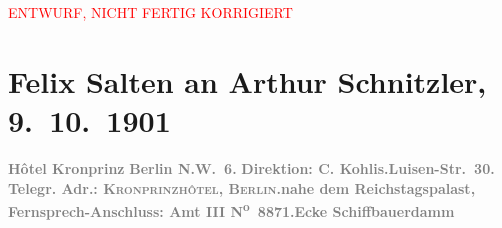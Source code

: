 
\begin{center}
            \textcolor{red}{ENTWURF, NICHT FERTIG KORRIGIERT}
                      \end{center}
            
         
         \renewcommand{\erwaehntePersonen}{Personen: Carl Kohlis, Olga Schnitzler}
         \renewcommand{\erwaehnteInstitutionen}{Institutionen: Jung-Wiener Theater zum Lieben Augustin}
         \renewcommand{\erwaehnteOrte}{Orte: Berlin, Hotel Kronprinz, Luisenstraße, Marschallbrücke, Reichstag, Schiffbauerdamm, Wien}
         \renewcommand{\erwaehnteWerke}{Werke: Die Gedenktafel der Prinzessin Anna, Die Insel. Monatsschrift mit Buchschmuck und Illustrationen, Schlange}
               \section[Felix Salten an Arthur Schnitzler, 9. 10. 1901]{ Felix Salten an Arthur Schnitzler, 9. 10. 1901}\nopagebreak{}\rehead{ }\begin{ledgroupsized}[t]{13cm}\normalsize\beginnumbering \toendnotes[C]{\smallbreak\pagebreak[2]} 
\toendnotes[C]{\smallbreak}\pstart
           \noindent{}\centering{}{\pb}\textcolor{gray}{\textbf{Hôtel Kronprinz}}\pend
           \pstart
           \noindent{}\raggedleft{}\textcolor{gray}{\textbf{Berlin N.W. 6.}}\pend
           \pstart
           \noindent{}\textcolor{gray}{\textbf{Direktion: C.
                           Kohlis.}}\hfill \textcolor{gray}{\textbf{Luisen-Str. 30.}}\pend
           \pstart
           \textcolor{gray}{\textbf{Telegr. Adr.: \textsc{Kronprinzhôtel, Berlin.}}}\hfill \textcolor{gray}{\textbf{nahe dem Reichstagspalast,}}\pend
           \pstart
           \textcolor{gray}{\textbf{Fernsprech-Anschluss: Amt III N\textsuperscript{o} 8871.}}\hfill \textcolor{gray}{\textbf{Ecke Schiffbauerdamm
}}
\end{ledgroupsized}
